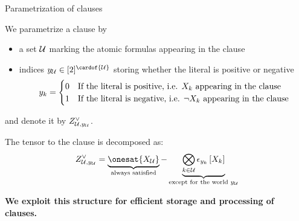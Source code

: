 \documentclass{beamer}
\begin{document}
    \begin{frame}{Parametrization of clauses}

        We parametrize a clause by
        \begin{itemize}
            \item a set $\mathcal{U}$ marking the atomic formulas appearing in the clause
            \item indices $\headindexof{\hardlegset}\in[2]^{\cardof{\hardlegset}}$ storing whether the literal is positive or negative
            \begin{align*}
                y_{k}
                = \begin{cases}
                      0 & \text{If the literal is positive, i.e. $X_{k}$ appearing in the clause} \\
                      1 & \text{If the literal is negative, i.e. $\lnot X_{k}$ appearing in the clause}
                \end{cases}
            \end{align*}
        \end{itemize}
        and denote it by $Z^{\lor}_{\mathcal{U},y_{\mathcal{U}}}$.

        \vfill

        The tensor to the clause is decomposed as:
        \begin{align*}
            \clauseof{\hardlegset,\headindexof{\hardlegset}}
            = \underbrace{\onesat{\catvariableof{\hardlegset}}}_{\text{always satisfied}}
            - \underbrace{\bigotimes_{\catenumerator\in\hardlegset} \onehotmapofat{\headindexof{\catenumerator}}{\catvariableof{\catenumerator}}}_{\text{except for the world $\headindexof{\hardlegset}$}}
        \end{align*}
        \begin{center}
            {\bf We exploit this structure for efficient storage and processing of clauses.}
        \end{center}

    \end{frame}
\end{document}
